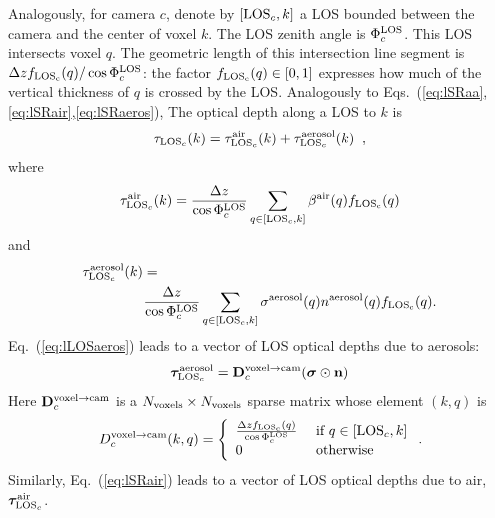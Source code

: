 \documentclass[10pt,twocolumn,letterpaper]{article}
\newcommand{\vect}[1]{\bm{#1}}
\begin{document}
Analogously, for camera $c$, denote by $[{\rm LOS}_c,k]$
a LOS bounded between the camera and the center of voxel $k$. The LOS zenith angle is $\Phi^{\rm LOS}_c$.
This LOS intersects voxel $q$. The geometric length of this intersection
line segment is $\Delta z f_{\rm LOS_c}(q)/\cos\Phi^{\rm LOS}_c$: the factor
$f_{\rm LOS_c}(q)\in [0,1]$ expresses how much of the vertical thickness of $q$ is crossed by the LOS.
Analogously to Eqs.~(\ref{eq:lSRaa},\ref{eq:lSRair},\ref{eq:lSRaeros}),
The optical depth %
along a LOS to $k$ is
\begin{equation}
  \tau_{{\rm LOS}_c}(k)=
   \tau_{{\rm LOS}_c}^{\rm air}(k) +  \tau_{{\rm LOS}_c}^{\rm aerosol}(k)
  \;\;,
  \label{eq:lLOSaerot}
\end{equation}
where
\begin{equation}
  \tau_{{\rm LOS}_c}^{\rm air}(k)=\frac{\Delta z}{\cos\Phi^{\rm LOS}_c}
     \sum_{q \in[{\rm LOS}_c,k]}
     \beta^{\rm air}(q)  f_{\rm LOS_c}(q)
  \label{eq:lLOSair}
\end{equation}
and
\begin{align}
  \label{eq:lLOSaeros}
  \tau_{{\rm LOS}_c}^{\rm aerosol}(k)=
  ~~~~~~~~~~~~~~~~~~~~~~~~~~~~~~~~~~~~~
  ~~~~~~~~~~~~~~~~~~%
  ~~~~~
  \\
   \frac{\Delta z}{\cos\Phi^{\rm LOS}_c}
     \sum_{q \in[{\rm LOS}_c,k]}
     \sigma^{\rm aerosol}(q) n^{\rm aerosol}(q) f_{\rm LOS_c}(q).
     \nonumber
\end{align}
Eq.~(\ref{eq:lLOSaeros}) leads to a vector of LOS optical depths due to aerosols:
\begin{equation}
  \vect{\tau}_{{\rm LOS}_c}^{\rm aerosol}=
  {\bf D}^{\mathrm{voxel \rightarrow cam}}_c
     (\vect{\sigma} \odot {\bf n})
  \label{eq:tauLOSvec1}
\end{equation}
Here ${\bf D}^{\mathrm{voxel \rightarrow cam}}_c$ is a 
$N_{\rm voxels}\times N_{\rm voxels}$ sparse matrix whose element $(k,q)$ is
\begin{equation}
  D^{\mathrm{voxel \rightarrow cam}}_c(k,q) =
  \left\{
      \begin{array}{ll}
          \frac{\Delta z f_{\rm LOS_c}(q)}{\cos\Phi^{\rm LOS}_c}
                & \mbox{ if $q \in[{\rm LOS}_c,k]$} \\
          0  & \mbox{ otherwise}
    \label{eq:Dvc}
       \end{array}
  \right.
  .
  \hspace{-0.05cm}
\end{equation}
Similarly, Eq.~(\ref{eq:lSRair}) leads to a vector of LOS optical depths due to air,
$\vect{\tau}_{{\rm LOS}_c}^{\rm air}$.
\end{document}
